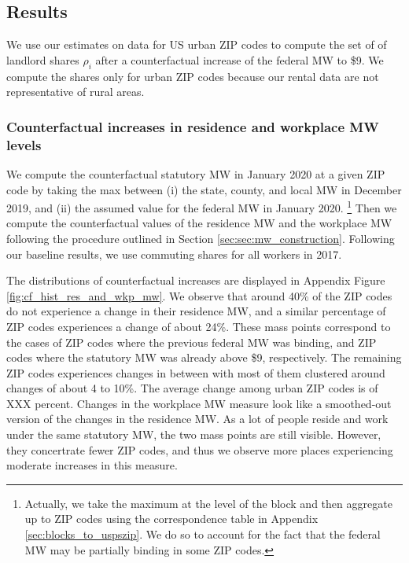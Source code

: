 \subsection{Results}\label{sec:results_cf}

We use our estimates on data for US urban ZIP codes to compute the set of
of landlord shares ${\rho_i}$ after a counterfactual increase of the federal 
MW to \$9.
We compute the shares only for urban ZIP codes because our rental data are not 
representative of rural areas.

\subsubsection*{Counterfactual increases in residence and workplace MW levels}
\label{sec:cf_res_and_wkp_changes}

We compute the counterfactual statutory MW in January 2020 at a given ZIP code 
by taking the max between (i) the state, county, and local MW in December 2019, 
and (ii) the assumed value for the federal MW in January 2020.%
\footnote{Actually, we take the maximum at the level of the block and then
aggregate up to ZIP codes using the correspondence table in Appendix 
\ref{sec:blocks_to_uspszip}.
We do so to account for the fact that the federal MW may be partially binding
in some ZIP codes.}
Then we compute the counterfactual values of the residence MW and the workplace
MW following the procedure outlined in Section \ref{sec:sec:mw_construction}.
Following our baseline results, we use commuting shares for all workers in
2017.

The distributions of counterfactual increases are displayed in Appendix
Figure \ref{fig:cf_hist_res_and_wkp_mw}.
We observe that around 40\% of the ZIP codes do not experience a change 
in their residence MW, and a similar percentage of ZIP codes experiences a
change of about 24\%.
These mass points correspond to the cases of ZIP codes where the previous 
federal MW was binding, and ZIP codes where the statutory MW was already 
above \$9, respectively.
The remaining ZIP codes experiences changes in between with most of them
clustered around changes of about 4 to 10\%.
The average change among urban ZIP codes is of XXX percent.
Changes in the workplace MW measure look like a smoothed-out version of
the changes in the residence MW.
As a lot of people reside and work under the same statutory MW, the two mass
points are still visible.
However, they concertrate fewer ZIP codes, and thus we observe more places 
experiencing moderate increases in this measure.


